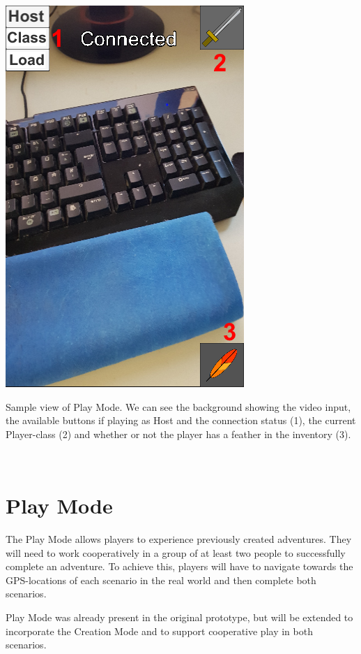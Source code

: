 \documentclass{sigchi-ext}
\begin{document}
\begin{marginfigure}[-20pc]
	\begin{minipage}{\marginparwidth}
		\centering
		\includegraphics[width=1\marginparwidth]{figures/PM_Entering}
		\caption{Sample view of Play Mode. We can see the background showing the video input, the available buttons if playing as Host and the connection status (1), the current Player-class (2) and whether or not the player has a feather in the inventory (3). }~\label{fig:PM_Entering}
	\end{minipage}
\end{marginfigure}

\section{Play Mode}
\label{sec:Play}


The Play Mode allows players to experience previously created adventures. They will need to work cooperatively in a group of at least two people to successfully complete an adventure. To achieve this, players will have to navigate towards the GPS-locations of each scenario in the real world and then complete both scenarios. 

Play Mode was already present in the original prototype, but will be extended to incorporate the Creation Mode and to support cooperative play in both scenarios.
\end{document}
